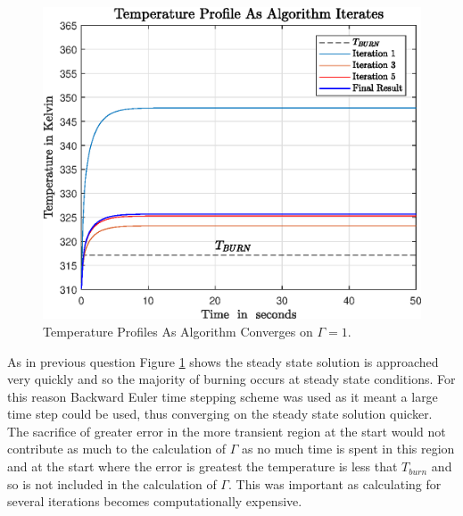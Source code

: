 \documentclass[11pt]{article}
\begin{document}
\begin{figure}[t]  %
	\centering
	\includegraphics[width=.75\textwidth]{epsQ22BCTempProfs}
    \caption{Temperature Profiles As Algorithm Converges on $\Gamma = 1$.}\label{fig:q22profs}
\end{figure}
\FloatBarrier
As in previous question Figure \ref{fig:q22profs} shows the steady state solution is approached very quickly and so the majority of burning occurs at steady state conditions. For this reason Backward Euler time stepping scheme was used as it meant a large time step could be used, thus converging on the steady state solution quicker. The sacrifice of greater error in the more transient region at the start would not contribute as much to the calculation of $\Gamma$ as no much time is spent in this region and at the start where the error is greatest the temperature is less that $T_{burn}$ and so is not included in the calculation of $\Gamma$. This was important as calculating for several iterations becomes computationally expensive.
\end{document}
